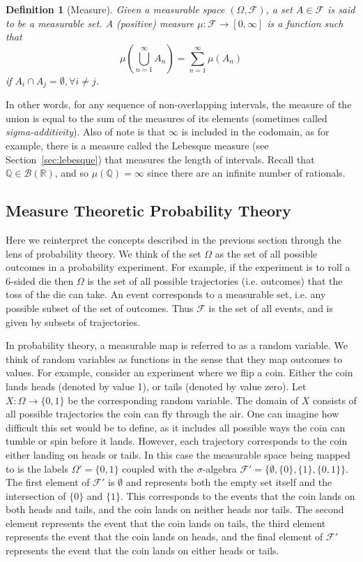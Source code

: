 \documentclass[10pt, oneside]{article}
\newcommand{\R}{\mathbb{R}}
\newcommand{\Q}{\mathbb{Q}}
\newtheorem{defn}{Definition}
\begin{document}
\begin{defn}[Measure]
    \label{defn:measure}
    Given a measurable space $(\Omega,\mathcal{F})$, a set $A\in \mathcal{F}$ is said to be a measurable set.
    A (positive) measure $\mu:\mathcal{F}\to [0,\infty]$ is a function such that $$\mu(\bigcup_{n=1}^{\infty}A_n)=\sum_{n=1}^{\infty}\mu(A_n)$$ if $A_i\cap A_j=\emptyset,\forall i\ne j$. 
\end{defn}
In other words, for any sequence of non-overlapping intervals, the measure of the union is equal to the sum of the measures of its elements (sometimes called \emph{sigma-additivity}).
Also of note is that $\infty$ is included in the codomain, as for example, there is a measure called the Lebesque measure (see Section~\ref{sec:lebesque}) that measures the length of intervals. Recall that $\Q\in\mathcal{B}(\R)$, and so $\mu(\Q)=\infty$ since there are an infinite number of rationals.

\subsection{Measure Theoretic Probability Theory}

Here we reinterpret the concepts described in the previous section through the lens of probability theory.
We think of the set $\Omega$ as the set of all possible outcomes in a probability experiment. For example, if the experiment is to roll a 6-sided die then $\Omega$ is the set of all possible trajectories (i.e. outcomes) that the toss of the die can take.
An event corresponds to a measurable set, i.e. any possible subset of the set of outcomes.
Thus $\mathcal{F}$ is the set of all events, and is given by subsets of trajectories.

In probability theory, a measurable map is referred to as a random variable.
We think of random variables as functions in the sense that they map outcomes to values.
For example, consider an experiment where we flip a coin. 
Either the coin lands heads (denoted by value 1), or tails (denoted by value zero). 
Let $X:\Omega\to\{0,1\}$ be the corresponding random variable.
The domain of $X$ consists of all possible trajectories the coin can fly through the air. One can imagine how difficult this set would be to define, as it includes all possible ways the coin can tumble or spin before it lands.
However, each trajectory corresponds to the coin either landing on heads or tails.
In this case the measurable space being mapped to is the labels $\Omega'=\{0,1\}$ coupled with the $\sigma$-algebra $\mathcal{F}'=\{\emptyset,\{0\},\{1\},\{0,1\}\}$.
The first element of $\mathcal{F}'$ is $\emptyset$ and represents both the empty set itself and the intersection of $\{0\}$ and $\{1\}$.
This corresponds to the events that the coin lands on both heads and tails, and the coin lands on neither heads nor tails.
The second element represents the event that the coin lands on tails, the third element represents the event that the coin lands on heads, and the final element of $\mathcal{F}'$ represents the event that the coin lands on either heads or tails.
\end{document}
